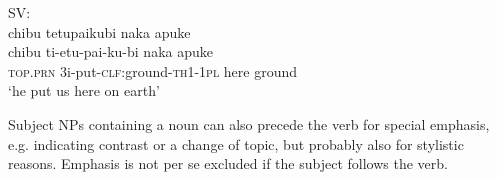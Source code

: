 \ea\label{ex:chibuchibu}
\begingl
\glpreamble \textup{SV:}\\chibu tetupaikubi naka apuke\\
\gla chibu ti-etu-pai-ku-bi naka apuke\\
\textsc{top.prn} 3i-put-\textsc{clf:}ground-\textsc{th}1-1\textsc{pl} here ground\\
\glft ‘he put us here on earth’
\endgl
\trailingcitation{[uxx-p110825l.111]}
\xe


Subject NPs containing a noun can also precede the verb for special emphasis, e.g. indicating contrast or a change of topic, but probably also for stylistic reasons.  Emphasis is not per se excluded if the subject follows the verb.
%
%



%

